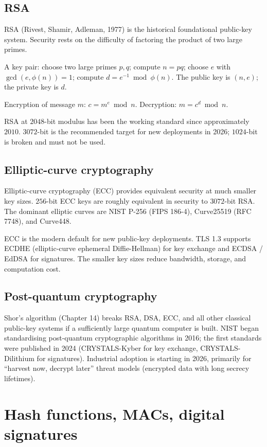 \subsection{RSA}

RSA (Rivest, Shamir, Adleman, 1977) is the historical foundational public-key system. Security rests on the difficulty of factoring the product of two large primes.

A key pair: choose two large primes $p, q$; compute $n = pq$; choose $e$ with $\gcd(e, \phi(n)) = 1$; compute $d = e^{-1} \bmod \phi(n)$. The public key is $(n, e)$; the private key is $d$.

Encryption of message $m$: $c = m^e \bmod n$. Decryption: $m = c^d \bmod n$.

RSA at $2048$-bit modulus has been the working standard since approximately $2010$. $3072$-bit is the recommended target for new deployments in 2026; $1024$-bit is broken and must not be used.

\subsection{Elliptic-curve cryptography}

Elliptic-curve cryptography (ECC) provides equivalent security at much smaller key sizes. $256$-bit ECC keys are roughly equivalent in security to $3072$-bit RSA. The dominant elliptic curves are NIST P-256 (FIPS 186-4), Curve25519 (RFC 7748), and Curve448.

ECC is the modern default for new public-key deployments. TLS 1.3 supports ECDHE (elliptic-curve ephemeral Diffie-Hellman) for key exchange and ECDSA / EdDSA for signatures. The smaller key sizes reduce bandwidth, storage, and computation cost.

\subsection{Post-quantum cryptography}

Shor's algorithm (Chapter 14) breaks RSA, DSA, ECC, and all other classical public-key systems if a sufficiently large quantum computer is built. NIST began standardising post-quantum cryptographic algorithms in 2016; the first standards were published in 2024 (CRYSTALS-Kyber for key exchange, CRYSTALS-Dilithium for signatures). Industrial adoption is starting in 2026, primarily for ``harvest now, decrypt later'' threat models (encrypted data with long secrecy lifetimes).

\section{Hash functions, MACs, digital signatures}

